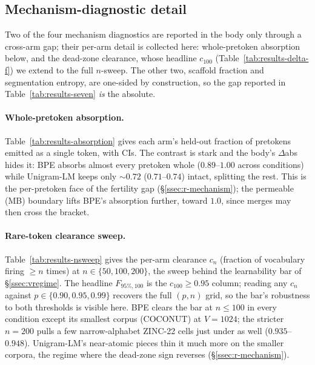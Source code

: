 \documentclass{article}
\begin{document}
\subsection{Mechanism-diagnostic detail}\label{app:mechanism}

Two of the four mechanism diagnostics are reported in the body only through a
cross-arm gap; their per-arm detail is collected here: whole-pretoken absorption
below, and the dead-zone clearance, whose headline $c_{100}$
(Table~\ref{tab:results-delta-f}) we extend to the full $n$-sweep. The other two,
scaffold fraction and segmentation entropy, are one-sided by construction, so the
gap reported in Table~\ref{tab:results-seven} \emph{is} the absolute.



\paragraph{Whole-pretoken absorption.}
Table~\ref{tab:results-absorption} gives each arm's held-out fraction of pretokens
emitted as a single token, with CIs. The contrast is stark and the body's
$\Delta$abs hides it: BPE absorbs almost every pretoken whole
($0.89$--$1.00$ across conditions) while Unigram-LM keeps only
$\sim$$0.72$ ($0.71$--$0.74$) intact, splitting the rest. This is the
per-pretoken face of the fertility gap (\S\ref{ssec:r-mechanism}); the permeable
(MB) boundary lifts BPE's absorption further, toward $1.0$, since merges may then
cross the bracket.



\paragraph{Rare-token clearance sweep.}
Table~\ref{tab:results-nsweep} gives the per-arm clearance $c_n$ (fraction of
vocabulary firing $\ge n$ times) at $n \in \{50, 100, 200\}$, the sweep behind the
learnability bar of \S\ref{ssec:vregime}. The headline $F_{95\%,100}$ is the
$c_{100} \ge 0.95$ column; reading any $c_n$ against $p \in \{0.90, 0.95, 0.99\}$
recovers the full $(p,n)$ grid, so the bar's robustness to both thresholds is
visible here. BPE clears the bar at $n{\le}100$ in every condition except its smallest corpus
(COCONUT) at $V{=}1024$; the stricter $n{=}200$ pulls a few narrow-alphabet
ZINC-22 cells just under as well ($0.935$--$0.948$). Unigram-LM's near-atomic
pieces thin it much more on the smaller corpora, the regime where the dead-zone
sign reverses (\S\ref{ssec:r-mechanism}).
\end{document}
